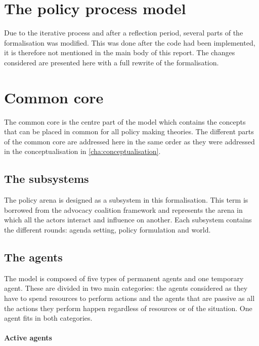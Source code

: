 \section{The policy process model}
\label{sec:ImplementationPolicy}

Due to the iterative process and after a reflection period, several parts of the formalisation was modified. This was done after the code had been implemented, it is therefore not mentioned in the main body of this report. The changes considered are presented here with a full rewrite of the formalisation.

\section{Common core}

The common core is the centre part of the model which contains the concepts that can be placed in common for all policy making theories. The different parts of the common core are addressed here in the same order as they were addressed in the conceptualisation in \autoref{cha:conceptualisation}.

\subsection{The subsystems}

The policy arena is designed as a subsystem in this formalisation. This term is borrowed from the advocacy coalition framework and represents the arena in which all the actors interact and influence on another. Each subsystem contains the different rounds: agenda setting, policy formulation and world.

\subsection{The agents}

The model is composed of five types of permanent agents and one temporary agent. These are divided in two main categories: the agents considered as they have to spend resources to perform actions and the agents that are passive as all the actions they perform happen regardless of resources or of the situation. One agent fits in both categories.

\paragraph{Active agents}

